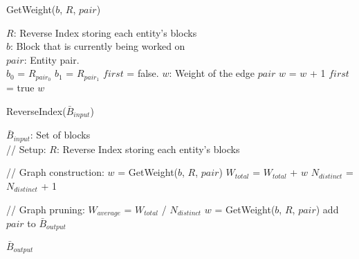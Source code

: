 \begin{algorithm}[H]
\caption{{\sc GetWeight($b$, $R$, $pair$)}}
\begin{algorithmic}
\REQUIRE $R$: Reverse Index storing each entity's blocks \\
         $b$: Block that is currently being worked on \\
         $pair$: Entity pair. \\
  \STATE $b_{0}$ = $R_{pair_{0}}$
  \STATE $b_{1}$ = $R_{pair_{1}}$
  \STATE $first$ = false.
  \STATE $w$: Weight of the edge $pair$
        \STATE $w$ = $w$ + 1
          \STATE $first$ = true
          \ENDIF
        \ENDIF
      \ENDIF
    \ENDFOR
  \ENDFOR
  \RETURN $w$

\end{algorithmic}
\end{algorithm}

\begin{algorithm}[H]
\caption{{\sc ReverseIndex($\bar B_{input}$)}}
\begin{algorithmic}

\REQUIRE $\bar B_{input}$: Set of blocks \\

\STATE // Setup:
\STATE $R$: Reverse Index storing each entity's blocks

\STATE // Graph construction:
    \STATE $w$ = GetWeight($b$, $R$, $pair$)
      \STATE $W_{total}$ = $W_{total}$ + $w$
      \STATE $N_{distinct}$ = $N_{distinct}$ + 1
    \ENDIF
  \ENDFOR
\ENDFOR

\STATE // Graph pruning:
\STATE $W_{average}$ = $W_{total}$ / $N_{distinct}$
    \STATE $w$ = GetWeight($b$, $R$, $pair$)
      \STATE add $pair$ to $\bar B_{output}$
    \ENDIF
  \ENDFOR
\ENDFOR

\RETURN $\bar B_{output}$ \\

\end{algorithmic}
\end{algorithm}
